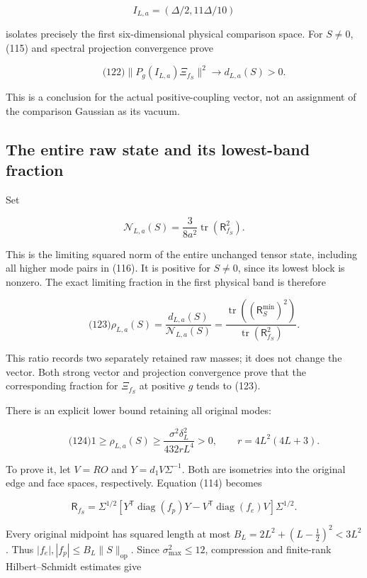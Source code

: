 \[
I_{L,a}=(\Delta/2,11\Delta/10)
\]

isolates precisely the first six-dimensional physical comparison space.
For \(S\ne0\), (115) and spectral projection convergence prove

\[
\qquad\text{(122)}
 \|P_g(I_{L,a})\Xi_{f_S}\|^2\longrightarrow d_{L,a}(S)>0.
\]

This is a conclusion for the actual positive-coupling vector, not an
assignment of the comparison Gaussian as its vacuum.

\subsection{The entire raw state and its lowest-band
fraction}\label{fabel-low-mode-transfer-md-the-entire-raw-state-and-its-lowest-band-fraction}

Set

\[
\mathcal N_{L,a}(S)=\frac3{8a^2}\operatorname{tr}(\mathsf R_{f_S}^2).
\]

This is the limiting squared norm of the entire unchanged tensor state,
including all higher mode pairs in (116). It is positive for \(S\ne0\),
since its lowest block is nonzero. The exact limiting fraction in the
first physical band is therefore

\[
\qquad\text{(123)}
 \rho_{L,a}(S)=
 \frac{d_{L,a}(S)}{\mathcal N_{L,a}(S)}
 =\frac{\operatorname{tr}((\mathsf R_S^{\min})^2)}
        {\operatorname{tr}(\mathsf R_{f_S}^2)}.
\]

This ratio records two separately retained raw masses; it does not
change the vector. Both strong vector and projection convergence prove
that the corresponding fraction for \(\Xi_{f_S}\) at positive \(g\)
tends to (123).

There is an explicit lower bound retaining all original modes:

\[
\qquad\text{(124)}
 1\ge\rho_{L,a}(S)\ge
 \frac{\sigma^2\delta_L^2}{432rL^4}>0,\qquad
 r=4L^2(4L+3).
\]

To prove it, let \(V=RO\) and \(Y=d_1V\Sigma^{-1}\). Both are isometries
into the original edge and face spaces, respectively. Equation (114)
becomes

\[
\mathsf R_{f_S}=\Sigma^{1/2}
  [Y^{\mathsf T}\operatorname{diag}(f_p)Y
             -V^{\mathsf T}\operatorname{diag}(f_e)V]\Sigma^{1/2}.
\]

Every original midpoint has squared length at most
\(B_L=2L^2+(L-\tfrac12)^2<3L^2\). Thus
\(|f_e|,|f_p|\le B_L\|S\|_{\mathrm{op}}\). Since
\(\sigma_{\max}^2\le12\), compression and finite-rank Hilbert--Schmidt
estimates give

